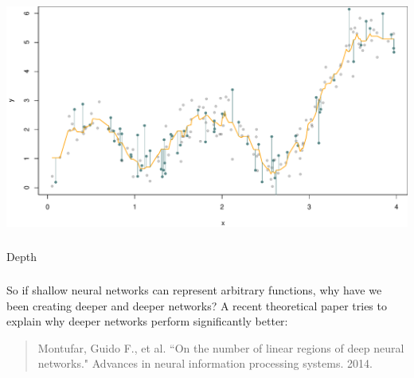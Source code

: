 \documentclass[xetex,mathserif,serif,aspectratio=169]{beamer}
\begin{document}
\begin{frame}[fragile] \frametitle{} \oldB \small

\begin{center}
\includegraphics[width=\textwidth]{img/valid7.pdf}
\end{center}

\end{frame}

\begin{frame}[fragile] \frametitle{} \oldB \small

\begin{flushright}
{\color{yaleblue}\sc\fontsize{1cm}{0cm}\selectfont Depth}
\end{flushright}

\end{frame}

\begin{frame}[fragile] \frametitle{} \oldB \small

So if shallow neural networks can represent arbitrary
functions, why have we been creating deeper and deeper
networks? A recent theoretical paper tries to explain
why deeper networks perform significantly better:
\begin{quote}
Montufar, Guido F., et al. ``On the number of linear regions of deep neural networks." Advances in neural information processing systems. 2014.
\end{quote}

\end{frame}
\end{document}
